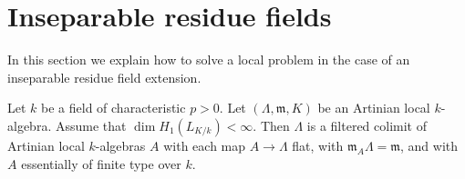 \section{Inseparable residue fields}
\label{section-inseparable}

\noindent
In this section we explain how to solve a local problem in the case
of an inseparable residue field extension.

\begin{lemma}
\label{lemma-helper}
Let $k$ be a field of characteristic $p > 0$.
Let $(\Lambda, \mathfrak m, K)$ be an Artinian local $k$-algebra.
Assume that $\dim H_1(L_{K/k}) < \infty$.
Then $\Lambda$ is a filtered colimit of Artinian
local $k$-algebras $A$ with each map $A \to \Lambda$ flat, with
$\mathfrak m_A \Lambda = \mathfrak m$, and with
$A$ essentially of finite type over $k$.
\end{lemma}

